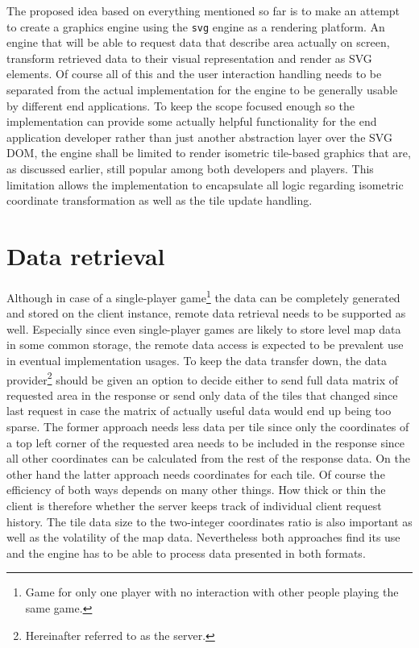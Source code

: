 \documentclass[11pt,oneside, final]{fithesis2}
\begin{document}
The proposed idea based on everything mentioned so far is to make an attempt to create a graphics engine using the \texttt{svg} engine as a rendering platform. An engine that will be able to request data that describe area actually on screen, transform retrieved data to their visual representation and render as SVG elements. Of course all of this and the user interaction handling needs to be separated from the actual implementation for the engine to be generally usable by different end applications. To keep the scope focused enough so the implementation can provide some actually helpful functionality for the end application developer rather than just another abstraction layer over the SVG DOM, the engine shall be limited to render isometric tile-based graphics that are, as discussed earlier, still popular among both developers and players. This limitation allows the implementation to encapsulate all logic regarding isometric coordinate transformation as well as the tile update handling.

\section{Data retrieval}
\label{datadesign}
Although in case of a single-player game\footnote{Game for only one player with no interaction with other people playing the same game.} the data can be completely generated and stored on the client instance, remote data retrieval needs to be supported as well. Especially since even single-player games are likely to store level map data in some common storage, the remote data access is expected to be prevalent use in eventual implementation usages. To keep the data transfer down, the data provider\footnote{Hereinafter referred to as the server.} should be given an option to decide either to send full data matrix of requested area in the response or send only data of the tiles that changed since last request in case the matrix of actually useful data would end up being too sparse. The former approach needs less data per tile since only the coordinates of a top left corner of the requested area needs to be included in the response since all other coordinates can be calculated from the rest of the response data. On the other hand the latter approach needs coordinates for each tile. Of course the efficiency of both ways depends on many other things. How thick or thin the client is therefore whether the server keeps track of individual client request history. The tile data size to the two-integer coordinates ratio is also important as well as the volatility of the map data. Nevertheless both approaches find its use and the engine has to be able to process data presented in both formats.
\end{document}
